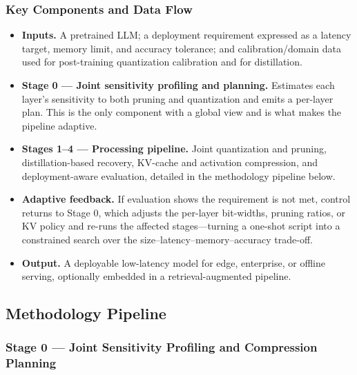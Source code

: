 \subsubsection{Key Components and Data Flow}

\begin{itemize}

  \item \textbf{Inputs.} A pretrained LLM; a deployment requirement expressed as a latency target, memory limit, and accuracy tolerance; and calibration/domain data used for post-training quantization calibration and for distillation.

  \item \textbf{Stage 0 --- Joint sensitivity profiling and planning.} Estimates each layer's sensitivity to both pruning and quantization and emits a per-layer plan. This is the only component with a global view and is what makes the pipeline adaptive.

  \item \textbf{Stages 1--4 --- Processing pipeline.} Joint quantization and pruning, distillation-based recovery, KV-cache and activation compression, and deployment-aware evaluation, detailed in the methodology pipeline below.

  \item \textbf{Adaptive feedback.} If evaluation shows the requirement is not met, control returns to Stage 0, which adjusts the per-layer bit-widths, pruning ratios, or KV policy and re-runs the affected stages---turning a one-shot script into a constrained search over the size--latency--memory--accuracy trade-off.

  \item \textbf{Output.} A deployable low-latency model for edge, enterprise, or offline serving, optionally embedded in a retrieval-augmented pipeline.

\end{itemize}

\subsection{Methodology Pipeline}

\subsubsection{Stage 0 --- Joint Sensitivity Profiling and Compression Planning}

